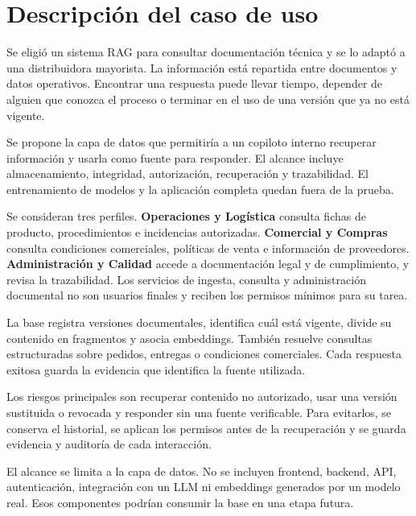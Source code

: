 \section{Descripción del caso de uso}

Se eligió un sistema RAG para consultar documentación técnica y se lo adaptó a
una distribuidora mayorista. La información está repartida entre documentos y
datos operativos. Encontrar una respuesta puede llevar tiempo, depender de
alguien que conozca el proceso o terminar en el uso de una versión que ya no
está vigente.

Se propone la capa de datos que permitiría a un copiloto interno recuperar
información y usarla como fuente para responder. El alcance incluye
almacenamiento, integridad, autorización, recuperación y trazabilidad. El
entrenamiento de modelos y la aplicación completa quedan fuera de la prueba.

Se consideran tres perfiles. \textbf{Operaciones y Logística} consulta fichas de
producto, procedimientos e incidencias autorizadas. \textbf{Comercial y
Compras} consulta condiciones comerciales, políticas de venta e información de
proveedores. \textbf{Administración y Calidad} accede a documentación legal y
de cumplimiento, y revisa la trazabilidad. Los servicios de ingesta, consulta y
administración documental no son usuarios finales y reciben los permisos
mínimos para su tarea.

La base registra versiones documentales, identifica cuál está vigente, divide
su contenido en fragmentos y asocia embeddings. También resuelve consultas
estructuradas sobre pedidos, entregas o condiciones comerciales. Cada respuesta
exitosa guarda la evidencia que identifica la fuente utilizada.

Los riesgos principales son recuperar contenido no autorizado, usar una versión
sustituida o revocada y responder sin una fuente verificable. Para evitarlos, se
conserva el historial, se aplican los permisos antes de la recuperación y se
guarda evidencia y auditoría de cada interacción.

El alcance se limita a la capa de datos. No se incluyen frontend, backend, API,
autenticación, integración con un LLM ni embeddings generados por un modelo
real. Esos componentes podrían consumir la base en una etapa futura.
